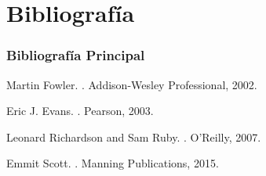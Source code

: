 \documentclass[handout,a4paper,t,xcolor=pst,dvips,colortheme]{beamer}
\begin{document}
\section{Bibliografía}

\begin{frame}[c]
	\frametitle{Bibliografía Principal}
    \begin{thebibliography}{1}

Martin Fowler.
.
\newblock Addison-Wesley Professional, 2002.

Eric J. Evans.
.
\newblock Pearson, 2003.

Leonard Richardson and Sam Ruby.
.
\newblock  O'Reilly, 2007.

\bibitem{}
Emmit Scott.
.
\newblock  Manning Publications, 2015.

\end{thebibliography}
\end{frame}
\end{document}
